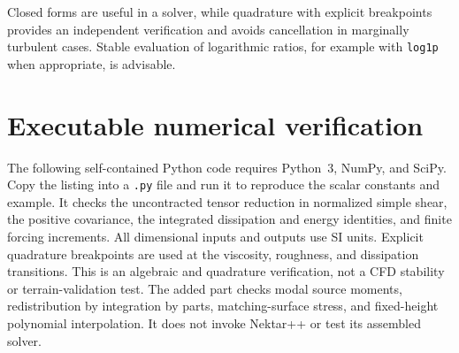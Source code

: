 \documentclass[11pt,a4paper]{article}
\numberwithin{equation}{section}
\begin{document}
Closed forms are useful in a solver, while quadrature with explicit
breakpoints provides an independent verification and avoids cancellation
in marginally turbulent cases. Stable evaluation of logarithmic ratios,
for example with \texttt{log1p} when appropriate, is advisable.
\section{Executable numerical verification}
\label{app:verification}
The following self-contained Python code requires Python~3, NumPy, and
SciPy. Copy the listing into a \texttt{.py} file and run it to reproduce
the scalar constants and example. It checks the uncontracted tensor
reduction in normalized simple shear, the positive covariance, the
integrated dissipation and energy identities, and finite forcing
increments. All dimensional inputs and outputs use SI units.
Explicit quadrature breakpoints are used at the viscosity, roughness,
and dissipation transitions. This is an algebraic and quadrature
verification, not a CFD stability or terrain-validation test. The
added part checks modal source moments, redistribution by integration
by parts, matching-surface stress, and fixed-height polynomial
interpolation. It does not invoke Nektar++ or test its assembled solver.
\end{document}
